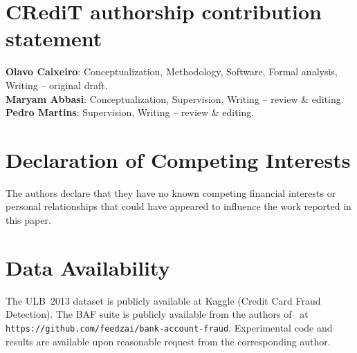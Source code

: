 \documentclass[a4paper,fleqn]{cas-sc}
\begin{document}
\section*{CRediT authorship contribution statement}

\textbf{Olavo Caixeiro}: Conceptualization, Methodology, Software, Formal analysis,
  Writing -- original draft. \\
\textbf{Maryam Abbasi}: Conceptualization, Supervision, Writing -- review \& editing. \\
\textbf{Pedro Martins}: Supervision, Writing -- review \& editing.

\section*{Declaration of Competing Interests}

The authors declare that they have no known competing financial interests or personal
relationships that could have appeared to influence the work reported in this paper.

\section*{Data Availability}

The ULB~2013 dataset is publicly available at Kaggle (Credit Card Fraud Detection).
The BAF suite is publicly available from the authors of~\citet{jesus2022turning}
at \texttt{https://github.com/feedzai/bank-account-fraud}.
Experimental code and results are available upon reasonable request from the
corresponding author.




\end{document}
